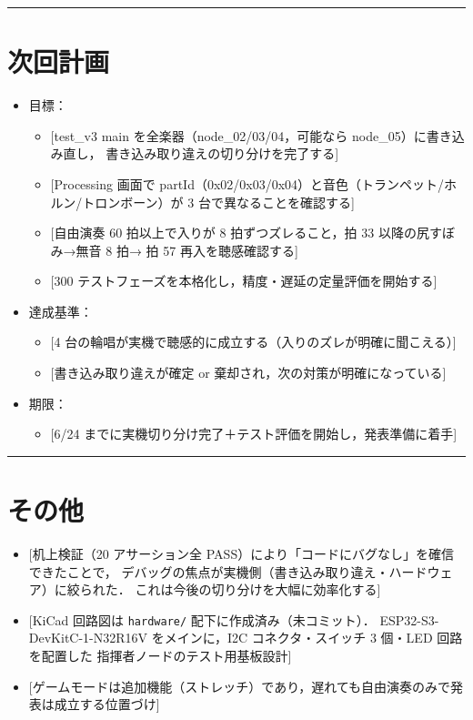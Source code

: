 \documentclass[uplatex,dvipdfmx,a4paper,11pt]{jsarticle}
\newcommand{\sectionrule}{\par\medskip\noindent\rule{\linewidth}{0.6pt}\par\medskip}
\begin{document}
\sectionrule

\section{次回計画}

\begin{itemize}
  \item 目標：
    \begin{itemize}
      \item {}[test\_v3 main を全楽器（node\_02/03/04，可能なら node\_05）に書き込み直し，
            書き込み取り違えの切り分けを完了する]
      \item {}[Processing 画面で partId（0x02/0x03/0x04）と音色（トランペット/ホルン/トロンボーン）が
            3 台で異なることを確認する]
      \item {}[自由演奏 60 拍以上で入りが 8 拍ずつズレること，拍 33 以降の尻すぼみ→無音 8 拍→
            拍 57 再入を聴感確認する]
      \item {}[300 テストフェーズを本格化し，精度・遅延の定量評価を開始する]
    \end{itemize}
  \item 達成基準：
    \begin{itemize}
      \item {}[4 台の輪唱が実機で聴感的に成立する（入りのズレが明確に聞こえる）]
      \item {}[書き込み取り違えが確定 or 棄却され，次の対策が明確になっている]
    \end{itemize}
  \item 期限：
    \begin{itemize}
      \item {}[6/24 までに実機切り分け完了＋テスト評価を開始し，発表準備に着手]
    \end{itemize}
\end{itemize}

\sectionrule

\section{その他}

\begin{itemize}
  \item {}[机上検証（20 アサーション全 PASS）により「コードにバグなし」を確信できたことで，
        デバッグの焦点が実機側（書き込み取り違え・ハードウェア）に絞られた．
        これは今後の切り分けを大幅に効率化する]
  \item {}[KiCad 回路図は \texttt{hardware/} 配下に作成済み（未コミット）．
        ESP32-S3-DevKitC-1-N32R16V をメインに，I2C コネクタ・スイッチ 3 個・LED 回路を配置した
        指揮者ノードのテスト用基板設計]
  \item {}[ゲームモードは追加機能（ストレッチ）であり，遅れても自由演奏のみで発表は成立する位置づけ]
\end{itemize}
\end{document}
